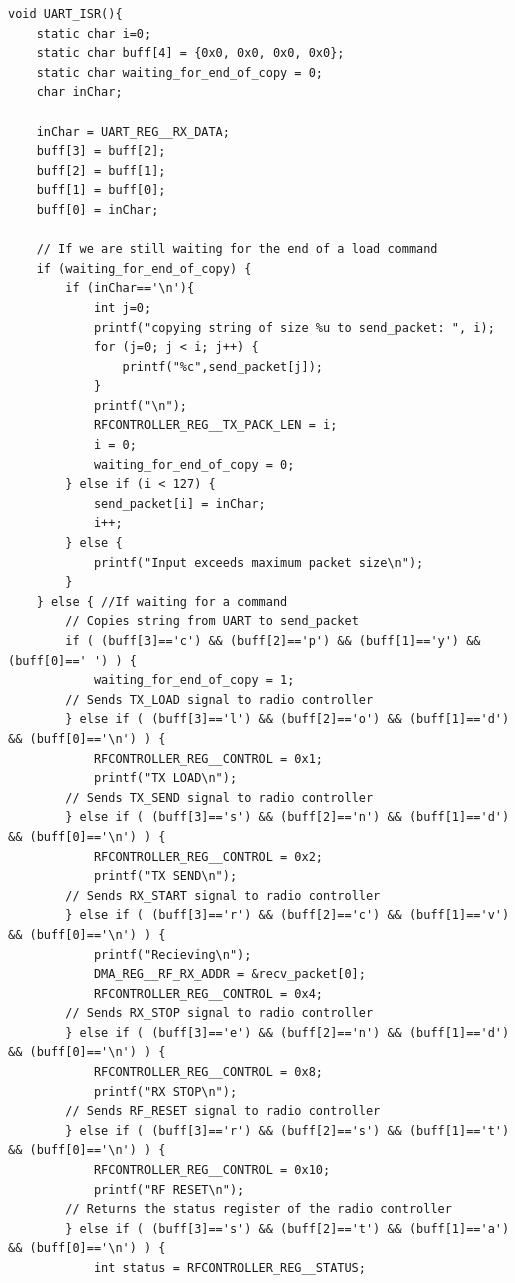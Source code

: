 \begin{lstlisting}
void UART_ISR(){	
    static char i=0;
    static char buff[4] = {0x0, 0x0, 0x0, 0x0};
    static char waiting_for_end_of_copy = 0;
    char inChar;

    inChar = UART_REG__RX_DATA;
    buff[3] = buff[2];
    buff[2] = buff[1];
    buff[1] = buff[0];
    buff[0] = inChar;

    // If we are still waiting for the end of a load command
    if (waiting_for_end_of_copy) {
        if (inChar=='\n'){
            int j=0;
            printf("copying string of size %u to send_packet: ", i);
            for (j=0; j < i; j++) {
                printf("%c",send_packet[j]);
            }
            printf("\n");
            RFCONTROLLER_REG__TX_PACK_LEN = i;
            i = 0;
            waiting_for_end_of_copy = 0;
        } else if (i < 127) {		
            send_packet[i] = inChar;			
            i++;
        } else {
            printf("Input exceeds maximum packet size\n");
        }
    } else { //If waiting for a command
        // Copies string from UART to send_packet
        if ( (buff[3]=='c') && (buff[2]=='p') && (buff[1]=='y') && (buff[0]==' ') ) {
            waiting_for_end_of_copy = 1;
        // Sends TX_LOAD signal to radio controller
        } else if ( (buff[3]=='l') && (buff[2]=='o') && (buff[1]=='d') && (buff[0]=='\n') ) {
            RFCONTROLLER_REG__CONTROL = 0x1;
            printf("TX LOAD\n");
        // Sends TX_SEND signal to radio controller
        } else if ( (buff[3]=='s') && (buff[2]=='n') && (buff[1]=='d') && (buff[0]=='\n') ) {
            RFCONTROLLER_REG__CONTROL = 0x2;
            printf("TX SEND\n");
        // Sends RX_START signal to radio controller
        } else if ( (buff[3]=='r') && (buff[2]=='c') && (buff[1]=='v') && (buff[0]=='\n') ) {
            printf("Recieving\n");
            DMA_REG__RF_RX_ADDR = &recv_packet[0];
            RFCONTROLLER_REG__CONTROL = 0x4;
        // Sends RX_STOP signal to radio controller
        } else if ( (buff[3]=='e') && (buff[2]=='n') && (buff[1]=='d') && (buff[0]=='\n') ) {
            RFCONTROLLER_REG__CONTROL = 0x8;
            printf("RX STOP\n");
        // Sends RF_RESET signal to radio controller
        } else if ( (buff[3]=='r') && (buff[2]=='s') && (buff[1]=='t') && (buff[0]=='\n') ) {
            RFCONTROLLER_REG__CONTROL = 0x10;
            printf("RF RESET\n");	
        // Returns the status register of the radio controller
        } else if ( (buff[3]=='s') && (buff[2]=='t') && (buff[1]=='a') && (buff[0]=='\n') ) {
            int status = RFCONTROLLER_REG__STATUS;

\end{lstlisting}
